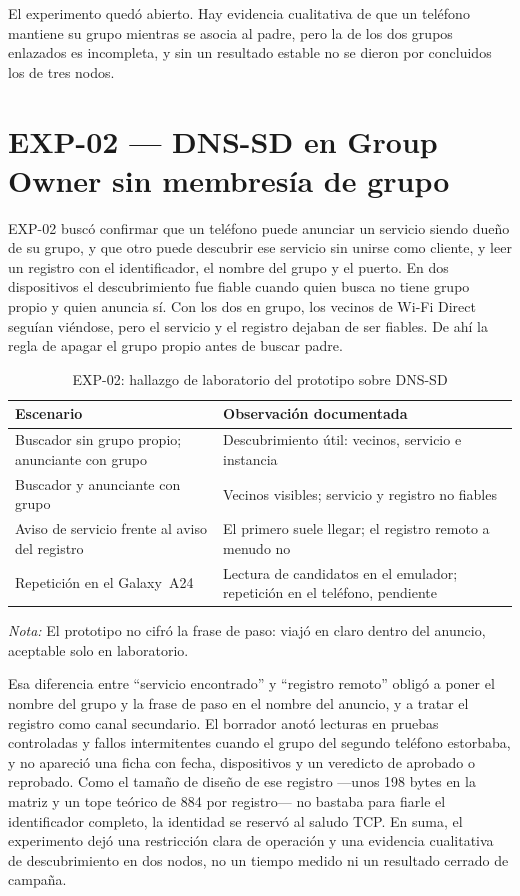 \documentclass[12pt,oneside]{scrreprt}
\begin{document}
El experimento quedó abierto. Hay evidencia cualitativa de que un teléfono mantiene su grupo mientras se asocia al padre, pero la de los dos grupos enlazados es incompleta, y sin un resultado estable no se dieron por concluidos los de tres nodos.

\section{EXP-02 --- DNS-SD en Group Owner sin membresía de grupo}

EXP-02 buscó confirmar que un teléfono puede anunciar un servicio siendo dueño de su grupo, y que otro puede descubrir ese servicio sin unirse como cliente, y leer un registro con el identificador, el nombre del grupo y el puerto. En dos dispositivos el descubrimiento fue fiable cuando quien busca no tiene grupo propio y quien anuncia sí. Con los dos en grupo, los vecinos de Wi-Fi Direct seguían viéndose, pero el servicio y el registro dejaban de ser fiables. De ahí la regla de apagar el grupo propio antes de buscar padre.

\begin{table}[H]
\centering
\singlespacing
\caption{EXP-02: hallazgo de laboratorio del prototipo sobre DNS-SD}
\label{tab:exp02-dns}
\renewcommand{\arraystretch}{1.15}
\begin{tabularx}{\textwidth}{@{} >{\raggedright\arraybackslash}p{6.4cm} X @{}}
\toprule
\textbf{Escenario} & \textbf{Observación documentada} \\
\midrule
Buscador sin grupo propio; anunciante con grupo & Descubrimiento útil: vecinos, servicio e instancia \\
Buscador y anunciante con grupo & Vecinos visibles; servicio y registro no fiables \\
Aviso de servicio frente al aviso del registro & El primero suele llegar; el registro remoto a menudo no \\
Repetición en el Galaxy~A24 & Lectura de candidatos en el emulador; repetición en el teléfono, pendiente \\
\bottomrule
\end{tabularx}
\par\vspace{0.2cm}
\small \raggedright \textit{Nota:} El prototipo no cifró la frase de paso: viajó en claro dentro del anuncio, aceptable solo en laboratorio.
\end{table}

Esa diferencia entre \enquote{servicio encontrado} y \enquote{registro remoto} obligó a poner el nombre del grupo y la frase de paso en el nombre del anuncio, y a tratar el registro como canal secundario. El borrador anotó lecturas en pruebas controladas y fallos intermitentes cuando el grupo del segundo teléfono estorbaba, y no apareció una ficha con fecha, dispositivos y un veredicto de aprobado o reprobado. Como el tamaño de diseño de ese registro ---unos 198 bytes en la matriz y un tope teórico de 884 por registro--- no bastaba para fiarle el identificador completo, la identidad se reservó al saludo TCP. En suma, el experimento dejó una restricción clara de operación y una evidencia cualitativa de descubrimiento en dos nodos, no un tiempo medido ni un resultado cerrado de campaña.
\end{document}
